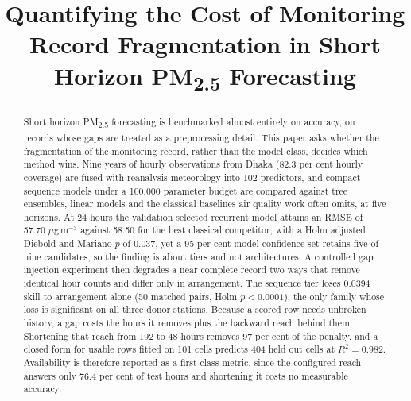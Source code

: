 \documentclass[conference]{IEEEtran}
\newcommand{\ugm}{$\mu$g\,m$^{-3}$}
\begin{document}
\title{Quantifying the Cost of Monitoring Record Fragmentation in Short Horizon PM\textsubscript{2.5} Forecasting
}


\maketitle

\begin{abstract}
Short horizon PM\textsubscript{2.5} forecasting is benchmarked almost entirely on accuracy, on
records whose gaps are treated as a preprocessing detail. This paper asks whether the
fragmentation of the monitoring record, rather than the model class, decides which method wins.
Nine years of hourly observations from Dhaka (82.3 per cent hourly coverage) are fused with
reanalysis meteorology into 102 predictors, and compact sequence models under a 100{,}000
parameter budget are compared against tree ensembles, linear models and the classical baselines
air quality work often omits, at five horizons. At 24 hours the validation selected recurrent
model attains an RMSE of 57.70 \ugm{} against 58.50 for the best classical competitor, with a
Holm adjusted Diebold and Mariano $p$ of 0.037, yet a 95 per cent model confidence set retains
five of nine candidates, so the finding is about tiers and not architectures. A controlled gap
injection experiment then degrades a near complete record two ways that remove identical hour
counts and differ only in arrangement. The sequence tier loses 0.0394 skill to arrangement
alone (50 matched pairs, Holm $p<0.0001$), the only family whose loss is significant on all
three donor stations. Because a scored row needs unbroken history, a gap costs the hours it
removes plus the backward reach behind them. Shortening that reach from 192 to 48 hours removes
97 per cent of the penalty, and a closed form for usable rows fitted on 101 cells predicts 404
held out cells at $R^2=0.982$. Availability is therefore reported as a first class metric, since
the configured reach answers only 76.4 per cent of test hours and shortening it costs no
measurable accuracy.
\end{abstract}
\end{document}
